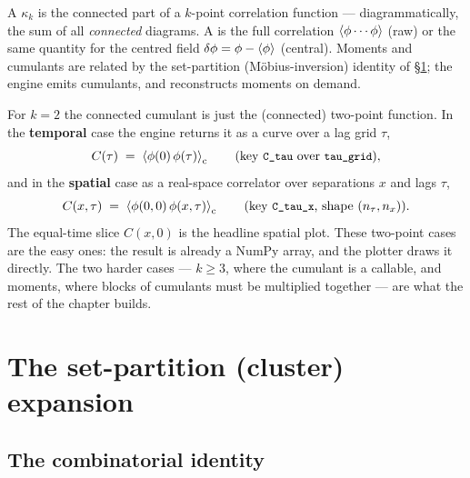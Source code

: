 \begin{defn}
A  $\kappa_k$ is the connected part of a $k$-point
correlation function --- diagrammatically, the sum of all \emph{connected}
diagrams. A  is the full correlation $\left\langle \phi\cdots\phi \right\rangle$ (raw) or
the same quantity for the centred field $\delta\phi=\phi-\left\langle \phi \right\rangle$ (central).
Moments and cumulants are related by the set-partition (M\"obius-inversion)
identity of \S\ref{sec:setpart}; the engine emits cumulants, and \Daedalus{}
reconstructs moments on demand.
\end{defn}

For $k=2$ the connected cumulant is just the (connected) two-point function. In
the \textbf{temporal} case the engine returns it as a curve over a lag grid
$\tau$,
\begin{equation}
  C(\tau) \;=\; \left\langle \phi(0)\,\phi(\tau) \right\rangle_{\mathrm c}
  \qquad\text{(key \texttt{\small C\_tau} over \texttt{\small tau\_grid})},
\end{equation}
and in the \textbf{spatial} case as a real-space correlator over separations $x$
and lags $\tau$,
\begin{equation}
  C(x,\tau) \;=\; \left\langle \phi(0,0)\,\phi(x,\tau) \right\rangle_{\mathrm c}
  \qquad\text{(key \texttt{\small C\_tau\_x}, shape $(n_\tau,n_x)$)}.
\end{equation}
The equal-time slice $C(x,0)$ is the headline spatial plot. These two-point cases
are the easy ones: the result is already a NumPy array, and the plotter draws it
directly. The two harder cases --- $k\!\ge\!3$, where the cumulant is a callable,
and moments, where blocks of cumulants must be multiplied together --- are what
the rest of the chapter builds.

\section{The set-partition (cluster) expansion}\label{sec:setpart}

\subsection{The combinatorial identity}

